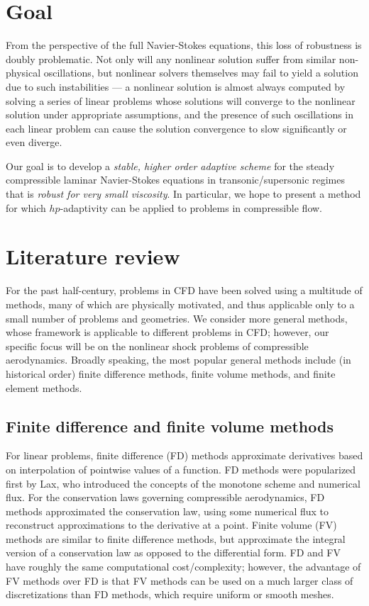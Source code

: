 \section{Goal}

From the perspective of the full Navier-Stokes equations, this loss of robustness is doubly problematic.  Not only will any nonlinear solution suffer from similar non-physical oscillations, but nonlinear solvers themselves may fail to yield a solution due to such instabilities --- a nonlinear solution is almost always computed by solving a series of linear problems whose solutions will converge to the nonlinear solution under appropriate assumptions, and the presence of such oscillations in each linear problem can cause the solution convergence to slow significantly or even diverge.  

Our goal is to develop a \emph{stable, higher order adaptive scheme} for the steady compressible laminar Navier-Stokes equations in transonic/supersonic regimes that is \emph{robust for very small viscosity}.  In particular, we hope to present a method for which $hp$-adaptivity can be applied to problems in compressible flow.  

\section{Literature review}

For the past half-century, problems in CFD have been solved using a multitude of methods, many of which are physically motivated, and thus applicable only to a small number of problems and geometries. We consider more general methods, whose framework is applicable to different problems in CFD; however, our specific focus will be on the nonlinear shock problems of compressible aerodynamics. Broadly speaking, the most popular general methods include (in historical order) finite difference methods, finite volume methods, and finite element methods.  

\subsection{Finite difference and finite volume methods}

For linear problems, finite difference (FD) methods approximate derivatives based on interpolation of pointwise values of a function.  FD methods were popularized first by Lax, who introduced the concepts of the monotone scheme and numerical flux. For the conservation laws governing compressible aerodynamics, FD methods approximated the conservation law, using some numerical flux to reconstruct approximations to the derivative at a point. Finite volume (FV) methods are similar to finite difference methods, but approximate the integral version of a conservation law as opposed to the differential form. FD and FV have roughly the same computational cost/complexity; however, the advantage of FV methods over FD is that FV methods can be used on a much larger class of discretizations than FD methods, which require uniform or smooth meshes. 

